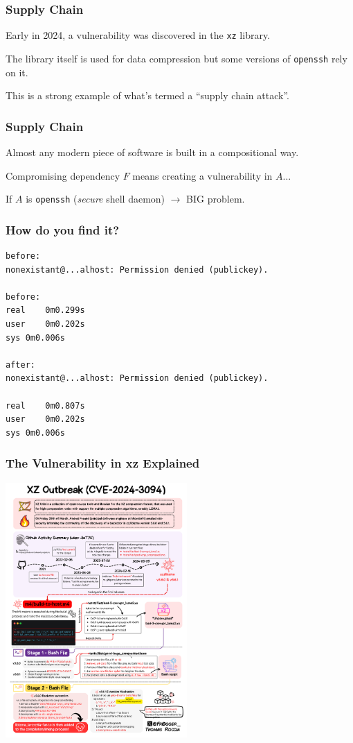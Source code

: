 \begin{frame}
\frametitle{Supply Chain}

Early in 2024, a vulnerability was discovered in the \texttt{xz} library.

The library itself is used for data compression but some versions of \texttt{openssh} rely on it. 

This is a strong example of what's termed a ``supply chain attack''. 

\end{frame}

\begin{frame}
\frametitle{Supply Chain}

Almost any modern piece of software is built in a compositional way.

Compromising dependency $F$ means creating a vulnerability in $A$...


If $A$ is \texttt{openssh} (\textit{secure} shell daemon) $\rightarrow$ BIG problem.

\end{frame}

\begin{frame}[fragile]
\frametitle{How do you find it?}

\begin{verbatim}
before:
nonexistant@...alhost: Permission denied (publickey).

before:
real	0m0.299s
user	0m0.202s
sys	0m0.006s

after:
nonexistant@...alhost: Permission denied (publickey).

real	0m0.807s
user	0m0.202s
sys	0m0.006s
\end{verbatim}

\end{frame}

\begin{frame}
\frametitle{The Vulnerability in xz Explained}

\begin{center}
  \includegraphics[width=0.52\textwidth]{images/xz.png}
\end{center}

\end{frame}

